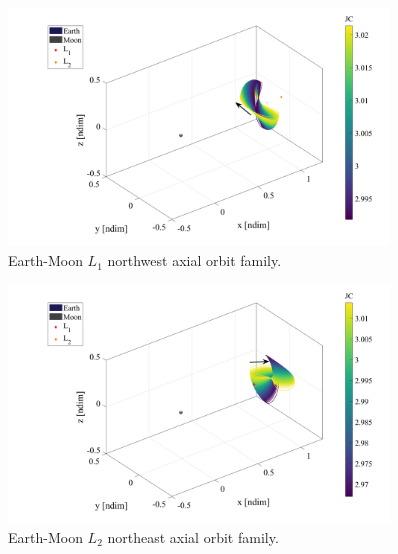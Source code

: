 \begin{figure}[ht]
    \centering
    \includegraphics[width=0.9\textwidth]{figures/L1AxialFamily.pdf}
    \caption{Earth-Moon $L_{1}$ northwest axial orbit family.}
    \label{fig:L1Axial}
\end{figure}

\begin{figure}[ht]
    \centering
    \includegraphics[width=0.9\textwidth]{figures/L2AxialFamily.pdf}
    \caption{Earth-Moon $L_{2}$ northeast axial orbit family.}
    \label{fig:L2Axial}
\end{figure}

